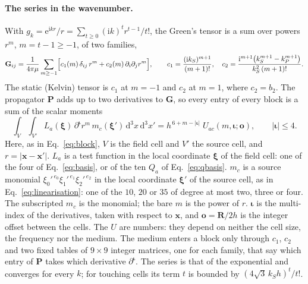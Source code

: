 \documentclass[11pt,a4paper]{article}
\newcommand{\bP}{\mathbf{P}}
\newcommand{\dd}{\mathrm{d}}
\begin{document}
\paragraph{The series in the wavenumber.} With $g_k=\mathrm{e}^{\mathrm{i}kr}/r=\sum_{t\ge0}(\mathrm{i}k)^t
r^{t-1}/t!$, the Green's tensor is a sum over powers $r^m$, $m=t-1\ge-1$, of two families,
\begin{equation}\label{eq:series}
  \mathbf{G}_{ij}=\frac{1}{4\pi\mu}\sum_{m\ge-1}\Bigl[c_1(m)\,\delta_{ij}\,r^m+c_2(m)\,\partial_i\partial_j r^m\Bigr],
  \qquad
  c_1=\frac{(\mathrm{i}k_S)^{m+1}}{(m+1)!},\quad
  c_2=\frac{\mathrm{i}^{m+1}\bigl(k_S^{m+1}-k_P^{m+1}\bigr)}{k_S^2\,(m+1)!}.
\end{equation}
The static (Kelvin) tensor is $c_1$ at $m=-1$ and $c_2$ at $m=1$, where $c_2=b_2$. The propagator $\bP$
adds up to two derivatives to $\mathbf{G}$, so every entry of every block is a sum of the scalar moments
\begin{equation}\label{eq:umoment}
  \int_{V}\!\int_{V'}L_a(\boldsymbol\xi)\,\partial^{\boldsymbol\iota}r^m\,m_c(\boldsymbol\xi')\,\dd^3x\,\dd^3x'
  =h^{\,6+m-|\boldsymbol\iota|}\;U_{ac}(m,\boldsymbol\iota;\mathbf{o}),
  \qquad |\boldsymbol\iota|\le4.
\end{equation}
Here, as in Eq.~\eqref{eq:block}, $V$ is the field cell and $V'$ the source cell, and
$r=|\mathbf{x}-\mathbf{x}'|$. $L_a$ is a test function in the local coordinate $\boldsymbol\xi$ of the
field cell: one of the four of Eq.~\eqref{eq:basis}, or of the ten $Q_a$ of Eq.~\eqref{eq:qbasis}. $m_c$
is a source monomial $\xi_0'^{\,e_0}\xi_1'^{\,e_1}\xi_2'^{\,e_2}$ in the local coordinate
$\boldsymbol\xi'$ of the source cell, as in Eq.~\eqref{eq:linearisation}: one of the $10$, $20$ or $35$
of degree at most two, three or four. The subscripted $m_c$ is the monomial; the bare $m$ is the power of
$r$. $\boldsymbol\iota$ is the multi-index of the derivatives, taken with respect to $\mathbf{x}$, and
$\mathbf{o}=\mathbf{R}/2h$ is the integer offset between the cells. The $U$ are numbers: they depend on
neither the cell size, the frequency nor the medium. The medium enters a block only through $c_1$, $c_2$ and
two fixed tables of $9\times9$ integer matrices, one for each family, that say which entry of $\bP$ takes
which derivative $\partial^{\boldsymbol\iota}$. The series is that of the exponential and converges for
every $k$; for touching cells its term $t$ is bounded by $(4\sqrt3\,k_Sh)^t/t!$.
\end{document}
